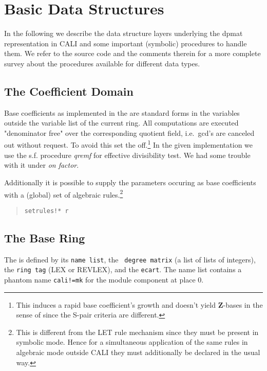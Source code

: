 \section{Basic Data Structures}

In the following we describe the data structure layers underlying the 
dpmat representation in CALI and some important (symbolic) procedures
to handle them. We refer to the source code and the comments therein for
a more complete survey about the procedures available for different
data types.

\subsection{The Coefficient Domain}

Base coefficients as implemented in the  are standard
forms in the variables outside the variable list of the current
ring. All computations are executed "denominator free" over the
corresponding quotient field, i.e.\ gcd's are canceled out without 
request. To avoid this set the  off.\footnote{This
induces a rapid base coefficient's growth and doesn't yield {\bf
Z}-\gr bases in the sense of \cite{GTZ} since the S-pair criteria are
different.} In the given implementation we use the s.f. procedure {\em
qremf} for effective divisibility test. We had some trouble with it
under {\em on factor}. 

Additionally it is possible to supply the
parameters occuring as base coefficients with a (global) set of
algebraic rules.\footnote{This is different from the LET rule
mechanism since they must be present in symbolic mode. Hence for a
simultaneous application of the same rules in algebraic mode outside
CALI they must additionally be declared in the usual way.}
\begin{quote}
\verb|setrules!* r|

\end{quote}

\subsection{The Base Ring}

The  is defined by its {\tt name list}, the {\tt
degree matrix} (a list of lists of integers), the {\tt ring tag} (LEX
or REVLEX), and the {\tt ecart}. The name list contains a phantom
name {\tt cali!=mk} for the module component at place 0.
\medskip

